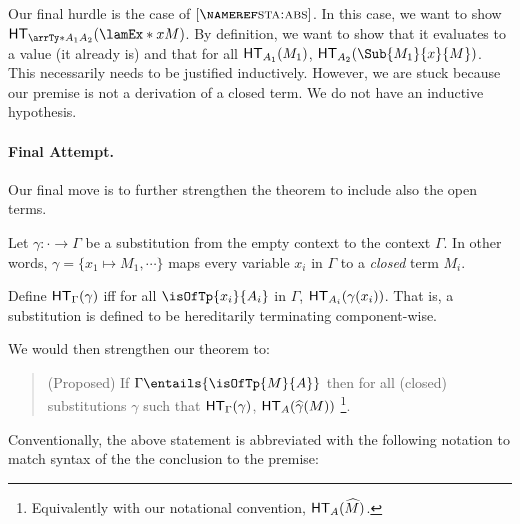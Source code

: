 \documentclass[letterpaper]{article}
\begin{document}
Our final hurdle is the case of $\ruleref{sta:abs}$. In this case, we want to show
$\HT[\arrTy*{A_1}{A_2}](\lamEx*{x}{M})$. By definition, we want to show that it evaluates
to a value (it already is) and that for all $\HT[A_1](M_1)$, $\HT[A_2](\Sub{M_1}{x}{M})$.
This necessarily needs to be justified inductively. However, we are stuck because our premise
is not a derivation of a closed term. We do not have an inductive hypothesis.

\paragraph{Final Attempt.} Our final move is to further strengthen the theorem to include also the
open terms.

Let $\gamma : \cdot \to \Gamma$ be a substitution from the empty context to the context $\Gamma$.
In other words, $\gamma = \{x_1 \mapsto M_1, \cdots\}$ maps every variable $x_i$ in $\Gamma$ to a
\emph{closed} term $M_i$.

Define $\HT[\Gamma](\gamma)$ iff for all $\isOfTp{x_i}{A_i}$ in $\Gamma$, $\HT[A_i](\gamma(x_i))$. That
is, a substitution is defined to be hereditarily terminating component-wise.

We would then strengthen our theorem to:

\begin{quotation}
(Proposed) If $\Gamma \entails{\isOfTp{M}{A}}$ then for all (closed) substitutions $\gamma$ such that
$\HT[\Gamma](\gamma)$, $\HT[A](\widehat{\gamma}(M))$ \footnote{Equivalently with our notational convention, $\HT[A](\widehat{M})$.}.
\end{quotation}

Conventionally, the above statement is abbreviated with the following notation to match syntax of the
the conclusion to the premise:
\end{document}
